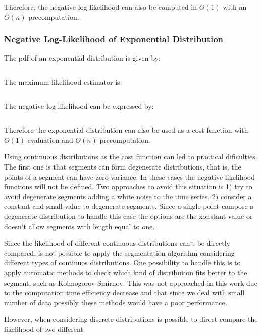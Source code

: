 Therefore, the negative log likelihood can also be computed in $O(1)$ with an $O(n)$ precomputation.

\subsubsection{Negative Log-Likelihood of Exponential Distribution}

The pdf of an exponential distribution is given by:

\begin{equation}
\end{equation}

The maximum likelihood estimator is:

\begin{equation}
\end{equation}

The negative log likelihood can be expressed by:

\begin{equation}
\end{equation}

Therefore the exponential distribution can also be used as a cost function with $O(1)$ evaluation and $O(n)$ precomputation.

Using continuous distributions as the cost function can led to practical dificulties. The first one is that segments can form degenerate distributions, that is, the points of a segment can have zero variance. In these cases the negative likelihood functions will not be defined. Two approaches to avoid this situation is 1) try to avoid degenerate segments adding a white noise to the time series. 2) consider a constant and small value to degenerate segments. Since a single point compose a degenerate distribution to handle this case the options are the xonstant value or doesn`t allow segments with length equal to one.

Since the likelihood of different continuous distributions can`t be directly compared, is not possible to apply the segmentation algorithm considering different types of continuos distributions. One possibility to handle this is to apply automatic methods to check which kind of distribution fits better to the segment, such as Kolmogorov-Smirnov. This was not approached in this work due to the computation time efficiency decrease and that since we deal with small number of data possibly these methods would have a poor performance.

However, when considering discrete distributions is possible to direct compare the likelihood of two different 

